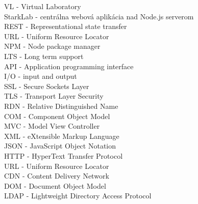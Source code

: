 VL - Virtual Laboratory\\
StarkLab - centrálna webová aplikácia nad Node.js serverom\\
REST - Representational state transfer\\
URL - Uniform Resource Locator\\
NPM - Node package manager\\
LTS - Long term support\\
API - Application programming interface\\
I/O - input and output\\
SSL - Secure Sockets Layer\\
TLS - Transport Layer Security\\
RDN - Relative Distinguished Name\\
COM - Component Object Model\\
MVC - Model View Controller\\
XML - eXtensible Markup Language\\
JSON - JavaScript Object Notation\\
HTTP - HyperText Transfer Protocol\\
URL - Uniform Resource Locator\\
CDN - Content Delivery Network\\
DOM - Document Object Model\\
LDAP - Lightweight Directory Access Protocol\\

